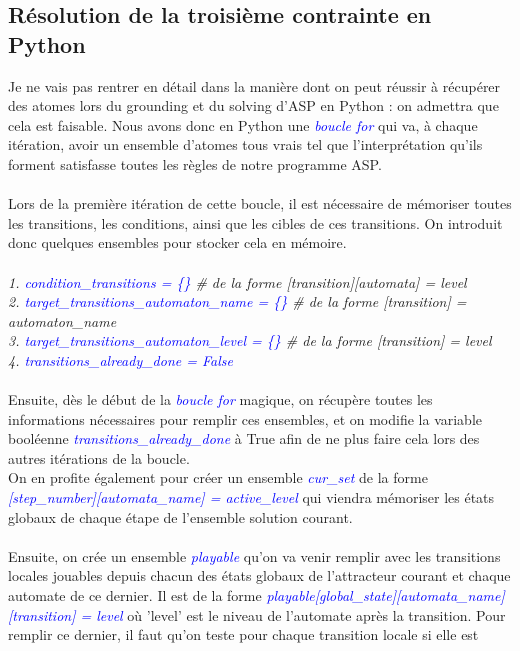 \documentclass[12pt,a4paper]{article}
\begin{document}
\subsection{Résolution de la troisième contrainte en Python}
Je ne vais pas rentrer en détail dans la manière dont on peut réussir à récupérer des atomes lors du grounding et du solving d'ASP en Python : on admettra que cela est faisable. Nous avons donc en Python une 
\textcolor{blue}{\emph{boucle for}} qui va, à chaque itération, avoir un ensemble d'atomes tous vrais tel que l'interprétation qu'ils forment satisfasse toutes les règles de notre programme ASP.\\ \\
Lors de la première itération de cette boucle, il est nécessaire de mémoriser toutes les transitions, les conditions, ainsi que les cibles de ces transitions. On introduit donc quelques ensembles pour stocker cela en mémoire.\\ \\
\emph{
	1. \textcolor{blue}{condition\_transitions = \{\}} \# de la forme [transition][automata] = level\\
	2. \textcolor{blue}{target\_transitions\_automaton\_name = \{\}} \# de la forme [transition] = automaton\_name\\
	3. \textcolor{blue}{target\_transitions\_automaton\_level = \{\}}  \# de la forme [transition] = level\\
	4. \textcolor{blue}{transitions\_already\_done = False}\\ \\
}
Ensuite, dès le début de la \emph{\textcolor{blue}{boucle for}} magique, on récupère toutes les informations nécessaires pour remplir ces ensembles, et on modifie la variable booléenne \emph{\textcolor{blue}
{transitions\_already\_done}} à True afin de ne plus faire cela lors des autres itérations de la boucle.\\
On en profite également pour créer un ensemble \emph{\textcolor{blue}{cur\_set}}  de la forme \emph{\textcolor{blue}{[step\_number][automata\_name] = active\_level}} qui viendra mémoriser les états globaux de chaque étape de 
l'ensemble solution courant.\\ \\
Ensuite, on crée un ensemble \emph{\textcolor{blue}{playable}} qu'on va venir remplir avec les transitions locales jouables depuis chacun des états globaux de l'attracteur courant et chaque automate de ce dernier. Il est de la forme 
\emph{\textcolor{blue}{playable[global\_state][automata\_name][transition] = level}} où 'level' est le niveau de l'automate après la transition. Pour remplir ce dernier, il faut qu'on teste pour chaque transition locale si elle est 
\end{document}
